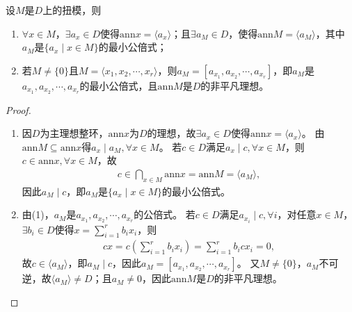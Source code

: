 \documentclass[../../main.tex]{subfiles}%
\begin{document}
\begin{lemma}
设$M$是$D$上的扭模，则
\begin{enumerate}[(1)]
\item $\forall x\in M$，$\exists a_x\in D$使得$\mathrm{ann}x=\langle a_x\rangle$；且$\exists a_M\in D$，使得$\mathrm{ann}M=\langle a_M\rangle$，其中$a_M$是$\{a_x\mid x\in M\}$的最小公倍式；
\item 若$M\neq\{0\}$且$M=\langle x_1,x_2,\cdots,x_r\rangle$，则$a_M=[a_{x_1},a_{x_2},\cdots,a_{x_r}]$，即$a_M$是$a_{x_1},a_{x_2},\cdots,a_{x_r}$的最小公倍式，且$\mathrm{ann}M$是$D$的非平凡理想。
\end{enumerate}
\end{lemma}
\begin{proof}
\begin{enumerate}[(1)]
\item 因$D$为主理想整环，$\mathrm{ann}x$为$D$的理想，故$\exists a_x\in D$使得$\mathrm{ann}x=\langle a_x\rangle$。
由$\mathrm{ann}M\subseteq\mathrm{ann}x$得$a_x\mid a_M,\forall x\in M$。
若$c\in D$满足$a_x\mid c,\forall x\in M$，则$c\in\mathrm{ann}x,\forall x\in M$，故
\begin{align*}
c\in\bigcap\limits_{x\in M}\mathrm{ann}x=\mathrm{ann}M=\langle a_M\rangle,
\end{align*}
因此$a_M\mid c$，即$a_M$是$\{a_x\mid x\in M\}$的最小公倍式。

\item 由(1)，$a_M$是$a_{x_1},a_{x_2},\cdots,a_{x_r}$的公倍式。
若$c\in D$满足$a_{x_i}\mid c,\forall i$，对任意$x\in M$，$\exists b_i\in D$使得$x=\sum\limits_{i=1}^{r}b_ix_i$，则
\begin{align*}
cx=c\left(\sum\limits_{i=1}^{r}b_ix_i\right)=\sum\limits_{i=1}^{r}b_icx_i=0,
\end{align*}
故$c\in\langle a_M\rangle$，即$a_M\mid c$，因此$a_M=[a_{x_1},a_{x_2},\cdots,a_{x_r}]$。
又$M\neq\{0\}$，$a_M$不可逆，故$\langle a_M\rangle\neq D$；且$a_M\neq0$，因此$\mathrm{ann}M$是$D$的非平凡理想。
\end{enumerate}

\end{proof}
\end{document}
